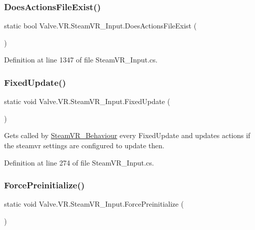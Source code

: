 \subsubsection{\texorpdfstring{DoesActionsFileExist()}{DoesActionsFileExist()}}
{\footnotesize\ttfamily static bool Valve.\+V\+R.\+Steam\+V\+R\+\_\+\+Input.\+Does\+Actions\+File\+Exist (\begin{DoxyParamCaption}{ }\end{DoxyParamCaption})\hspace{0.3cm}{\ttfamily [static]}}



Definition at line 1347 of file Steam\+V\+R\+\_\+\+Input.\+cs.

\mbox{\label{class_valve_1_1_v_r_1_1_steam_v_r___input_ac2be0c217bd7a2ee78bf0e8e33718247}} 
\subsubsection{\texorpdfstring{FixedUpdate()}{FixedUpdate()}}
{\footnotesize\ttfamily static void Valve.\+V\+R.\+Steam\+V\+R\+\_\+\+Input.\+Fixed\+Update (\begin{DoxyParamCaption}{ }\end{DoxyParamCaption})\hspace{0.3cm}{\ttfamily [static]}}



Gets called by \mbox{\hyperlink{class_valve_1_1_v_r_1_1_steam_v_r___behaviour}{Steam\+V\+R\+\_\+\+Behaviour}} every Fixed\+Update and updates actions if the steamvr settings are configured to update then. 



Definition at line 274 of file Steam\+V\+R\+\_\+\+Input.\+cs.

\mbox{\label{class_valve_1_1_v_r_1_1_steam_v_r___input_a305a60db4634439fc9cbbe0a64b0c5fb}} 
\subsubsection{\texorpdfstring{ForcePreinitialize()}{ForcePreinitialize()}}
{\footnotesize\ttfamily static void Valve.\+V\+R.\+Steam\+V\+R\+\_\+\+Input.\+Force\+Preinitialize (\begin{DoxyParamCaption}{ }\end{DoxyParamCaption})\hspace{0.3cm}{\ttfamily [static]}}



